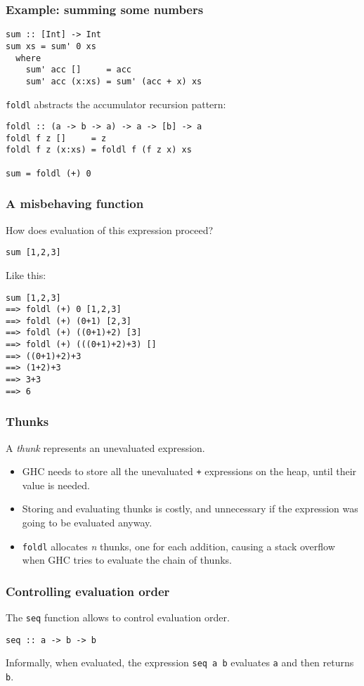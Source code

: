 \documentclass{beamer}
\begin{document}
\begin{frame}[fragile]
\frametitle{Example: summing some numbers}
  \begin{lstlisting}
sum :: [Int] -> Int
sum xs = sum' 0 xs
  where
    sum' acc []     = acc
    sum' acc (x:xs) = sum' (acc + x) xs
  \end{lstlisting}

  \lstinline!foldl! abstracts the accumulator recursion pattern:

  \begin{lstlisting}
foldl :: (a -> b -> a) -> a -> [b] -> a
foldl f z []     = z
foldl f z (x:xs) = foldl f (f z x) xs

sum = foldl (+) 0
  \end{lstlisting}  
\end{frame}

\begin{frame}[fragile]
\frametitle{A misbehaving function}
How does evaluation of this expression proceed?
\begin{lstlisting}
sum [1,2,3]
\end{lstlisting}

Like this:
\begin{verbatim}
sum [1,2,3]
==> foldl (+) 0 [1,2,3]
==> foldl (+) (0+1) [2,3]
==> foldl (+) ((0+1)+2) [3]
==> foldl (+) (((0+1)+2)+3) []
==> ((0+1)+2)+3
==> (1+2)+3
==> 3+3
==> 6
\end{verbatim}
\end{frame}

\begin{frame}
  \frametitle{Thunks}

  A \emph{thunk} represents an unevaluated expression.

\begin{itemize}
\item GHC needs to store all the unevaluated \lstinline!+! expressions
  on the heap, until their value is needed.
\item Storing and evaluating thunks is costly, and unnecessary if the
  expression was going to be evaluated anyway.
\item \lstinline!foldl! allocates \emph{n} thunks, one for each
  addition, causing a stack overflow when GHC tries to evaluate the
  chain of thunks.
\end{itemize}
\end{frame}

\begin{frame}[fragile]
  \frametitle{Controlling evaluation order}

  The \lstinline!seq! function allows to control evaluation order.

  \begin{lstlisting}
seq :: a -> b -> b
  \end{lstlisting}

  Informally, when evaluated, the expression \lstinline!seq a b!
  evaluates \lstinline!a! and then returns \lstinline!b!.
\end{frame}
\end{document}
